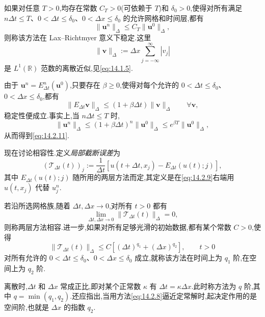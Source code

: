 \begin{definition*}
如果对任意 \(T>0\),均存在常数 \(C_T>0\)(可依赖于 \(T\))和 \(\delta_0>0\),使得对所有满足 \(n\Delta t\le T\)、\(0<\Delta t\le\delta_0\)、\(0<\Delta x\le\delta_0\) 的允许网格和时间层,都有
\begin{equation}\label{eq:14.2.11}
  \|\boldsymbol{u}^n\|_\Delta\le C_T\|\boldsymbol{u}^0\|_\Delta,
\end{equation}
则称该方法在 Lax--Richtmyer 意义下{\heiti 稳定}.这里
\begin{equation}\label{eq:14.2.12}
  \|\boldsymbol{v}\|_\Delta:=\Delta x\sum_{j=-\infty}^{\infty}|v_j|
\end{equation}
是 \(L^1(\mathbb R)\) 范数的离散近似,见\eqref{eq:14.1.5}.
\end{definition*}
由于 \(\boldsymbol{u}^n=E_{\Delta t}^n(\boldsymbol{u}^0)\),只要存在 \(\beta\ge0\),使得对每个允许的 \(0<\Delta t\le\delta_0\)、\(0<\Delta x\le\delta_0\),都有
\[
  \|E_{\Delta t}\boldsymbol{v}\|_\Delta
      \le(1+\beta\Delta t)\|\boldsymbol{v}\|_\Delta\qquad\forall\boldsymbol{v},
\]
稳定性便成立.事实上,当 \(n\Delta t\le T\) 时,
\[
  \|\boldsymbol{u}^n\|_\Delta\le(1+\beta\Delta t)^n\|\boldsymbol{u}^0\|_\Delta
       \le e^{\beta T}\|\boldsymbol{u}^0\|_\Delta,
\]
从而得到\eqref{eq:14.2.11}.

现在讨论相容性.定义\emph{局部截断误差}为
\[
  (\mathcal T_{\Delta t}(t))_j
     :=\frac1{\Delta t}[u(t+\Delta t,x_j)-E_{\Delta t}(u(t);j)],
\]
其中 \(E_{\Delta t}(u(t);j)\) 随所用的两层方法而定,其定义是在\eqref{eq:14.2.9}右端用 \(u(t,x_j)\) 代替 \(u_j^n\).
\begin{definition*}
若沿所选网格族,随着 \(\Delta t,\Delta x\to0\),对所有 \(t>0\) 都有
\begin{equation}\label{eq:14.2.13}
  \lim_{\Delta t,\Delta x\to0}\|\mathcal T_{\Delta t}(t)\|_\Delta=0,
\end{equation}
则称两层方法{\heiti 相容}.进一步,如果对所有足够光滑的初始数据,都有某个常数 \(C>0\),使得
\begin{equation}\label{eq:14.2.14}
  \|\mathcal T_{\Delta t}(t)\|_\Delta\le C[(\Delta t)^{q_1}+(\Delta x)^{q_2}],
    \qquad t>0
\end{equation}
对所有允许的 \(0<\Delta t\le\delta_0\)、\(0<\Delta x\le\delta_0\) 成立,就称该方法在时间上为 \(q_1\) 阶,在空间上为 \(q_2\) 阶.
\end{definition*}
离散时,\(\Delta t\) 和 \(\Delta x\) 常成正比,即对某个正常数 \(\kappa\) 有 \(\Delta t=\kappa\Delta x\).此时称方法为 \(q\) 阶,其中 \(q=\min(q_1,q_2)\).还应指出,当用方法\eqref{eq:14.2.8}逼近定常解时,起决定作用的是空间阶,也就是 \(\Delta x\) 的指数 \(q_2\).


